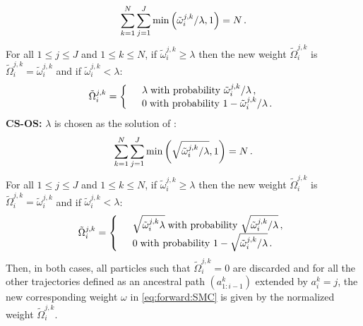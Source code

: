 \[
\sum_{k=1}^N\sum_{j=1}^J\mathrm{min}\left(\tilde{\omega}^{j,k}_{i}/\lambda,1\right) = N\,.
\]
For all $1\le j \le J$ and $1\le k \le N$, if $\tilde{\omega}^{j,k}_{i}\ge \lambda$ then the new weight $\tilde{\Omega}^{j,k}_{i}$ is $\tilde{\Omega}^{j,k}_{i}=\tilde{\omega}^{j,k}_{i}$ and if $\tilde{\omega}^{j,k}_{i}< \lambda$:
\[
\tilde{\Omega}^{j,k}_{i}=
\left\{
 \begin{array}{rl}
  &\lambda \;\mbox{with probability } \tilde{\omega}^{j,k}_{i}/\lambda\,,\\
&0 \;\mbox{with probability } 1-\tilde{\omega}^{j,k}_{i}/\lambda\,.
\end{array}
\right.
\]
\textbf{CS-OS:} $\lambda$ is chosen as the solution of :
\[
\sum_{k=1}^N\sum_{j=1}^J\mathrm{min}\left(\sqrt{\tilde{\omega}^{j,k}_{i}/\lambda},1\right) = N\,.
\]
For all $1\le j \le J$ and $1\le k \le N$, if $\tilde{\omega}^{j,k}_{i}\ge \lambda$ then the new weight $\tilde{\Omega}^{j,k}_{i}$ is $\tilde{\Omega}^{j,k}_{i}=\tilde{\omega}^{j,k}_{i}$ and if $\tilde{\omega}^{j,k}_{i}< \lambda$:
\[
\tilde{\Omega}^{j,k}_{i}=
\left\{
 \begin{array}{rl}
  &\sqrt{\tilde{\omega}^{j,k}_{i}\lambda} \;\mbox{with probability } \sqrt{\tilde{\omega}^{j,k}_{i}/\lambda}\,,\\
&0 \;\mbox{with probability } 1-\sqrt{\tilde{\omega}^{j,k}_{i}/\lambda}\,.
\end{array}
\right.
\]
Then, in both cases, all particles such that $\tilde{\Omega}^{j,k}_{i} = 0$ are discarded and for all the other trajectories defined as an ancestral path $(a^k_{1:i-1})$ extended by $a^k_i = j$, the new corresponding weight $\omega$ in \eqref{eq:forward:SMC} is given by the normalized weight $\tilde{\Omega}^{j,k}_{i}$.


